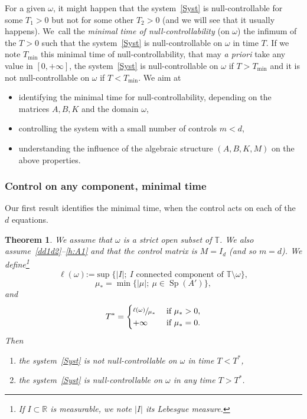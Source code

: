 \documentclass[JEP,XML,SOM,Unicode,NoEqCountersInSection]{cedram}
\theoremstyle{plain}
\newtheorem{theorem}{Theorem}
\theoremstyle{definition}
\theoremstyle{remark}
\DeclareMathOperator{\Sp}{Sp}
\newcommand{\set}{\mathbb}
\newcommand{\T}{\set{T}}
\newcommand{\coloneqq}{\mathrel{\mathord{:}\mathord=}}
\begin{document}
For a given $\omega$, it might happen that the system~\eqref{Syst} is null-controllable for some $T_1>0$ but not for some other $T_2>0$ (and we will see that it usually happens). We~call the \emph{minimal time of null-controllability} (on $\omega$) the infimum of the $T>0$ such that the system~\eqref{Syst} is null-controllable on $\omega$ in time $T$. If we note $T_{\mathrm{min}}$ this minimal time of null-controllability, that may \emph{a priori} take any value in $[0,+\infty]$, the system~\eqref{Syst} is null-controllable on $\omega$ if $T>T_{\mathrm{min}}$ and it is not null-controllable on $\omega$ if $T<T_{\mathrm{min}}$. We aim at
\begin{itemize}
\item identifying the minimal time for null-controllability, depending on the matrices $A,B,K$ and the domain $\omega$,
\item controlling the system with a small number of controls $m<d$,
\item understanding the influence of the algebraic structure $(A,B,K,M)$ on the above properties.
\end{itemize}


\subsubsection{Control on any component, minimal time}

Our first result identifies the minimal time, when the control acts on each of the $d$ equations.
\begin{theorem}\label{th:main}
We assume that $\omega$ is a strict open subset of $\set T$. We also assume~\eqref{dd1d2}--\eqref{h:A1} and that the control matrix is $M=I_d$ (and so $m=d$).
We define\footnote{If $I\subset \set R$ is measurable, we note $|I|$ its Lebesgue measure.}
\begin{equation}\label{eq:def_l}\ell(\omega) \coloneqq \sup\{ |I|;\ I \text{ connected component of } \T \setminus \omega \},\end{equation}
\[
\mu_*=\min\{ |\mu|;\ \mu \in \Sp(A') \},
\]
and
\begin{equation}\label{eq:T}
T^\ast =
\begin{cases}
\sfrac{\ell(\omega)}{\mu_*} & \text{ if } \mu_* >0, \\
+\infty & \text{ if } \mu_*=0.
\end{cases}
\end{equation}
Then
\begin{enumerate}
\item
\label{th:maini} the system~\eqref{Syst} is not null-controllable on $\omega$ in time $T<T^\ast$,
\item\label{th:mainii} the system~\eqref{Syst} is null-controllable on $\omega$ in any time $T>T^\ast$.
\end{enumerate}
\end{theorem}
\end{document}
